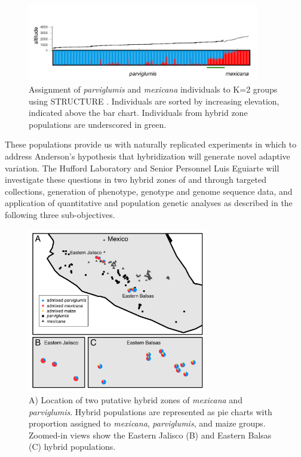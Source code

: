 \begin{figure}[tb] 
  \centering
   \includegraphics[width=0.9\textwidth]{structure.pdf}
    \caption{Assignment of \emph{parviglumis} and \emph{mexicana} individuals to K=2 groups using STRUCTURE \citep{Pritchard2000}.  Individuals are sorted by increasing elevation, indicated above the bar chart. Individuals from hybrid zone populations are underscored in green.} 
\label{fig:structure}
\end{figure}

These populations provide us with naturally replicated experiments in which to address Anderson's \citeyearpar{Anderson1954} hypothesis that hybridization will generate novel adaptive variation.
The Hufford Laboratory and Senior Personnel Luis Eguiarte will investigate these questions in two hybrid zones of \zm{} and \zp{} through targeted collections, generation of phenotype, genotype and genome sequence data, and application of quantitative and population genetic analyses as described in the following three sub-objectives.

\begin{figure}[t]
  \centering
   \includegraphics[width=0.7\textwidth]{Figure1.jpg}
    \caption{A) Location of two putative hybrid zones of \emph{mexicana} and \emph{parviglumis}.  Hybrid populations are represented as pie charts with proportion assigned to \emph{mexicana}, \emph{parviglumis}, and maize groups. Zoomed-in views show the Eastern Jalisco (B) and Eastern Balsas (C) hybrid populations.} 
\label{fig:pies}
\end{figure}

